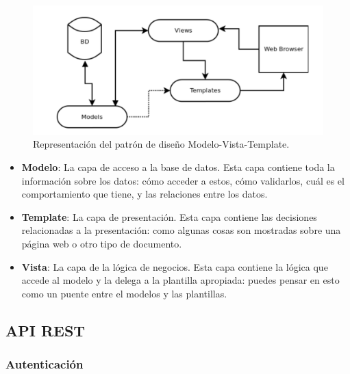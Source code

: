 \begin{figure}
    \centering
    \includegraphics[width=\textwidth]{capitulo2/images/mtv.png}
    \caption{Representación del patrón de diseño Modelo-Vista-Template.}
    \label{fig:mtv}
\end{figure}

\begin{itemize}
    \item \textbf{Modelo}: La capa de acceso a la base de datos. Esta capa contiene toda la información sobre los datos: cómo acceder a estos, cómo validarlos, cuál es el comportamiento que tiene, y las relaciones entre los datos.
    \item \textbf{Template}: La capa de presentación. Esta capa contiene las decisiones relacionadas a la presentación: como algunas cosas son mostradas sobre una página web o otro tipo de documento.
    \item \textbf{Vista}: La capa de la lógica de negocios. Esta capa contiene la lógica que accede al modelo y la delega a la plantilla apropiada: puedes pensar en esto como un puente entre el modelos y las plantillas.
\end{itemize}


\subsection{API REST}
\subsubsection{Autenticación}


